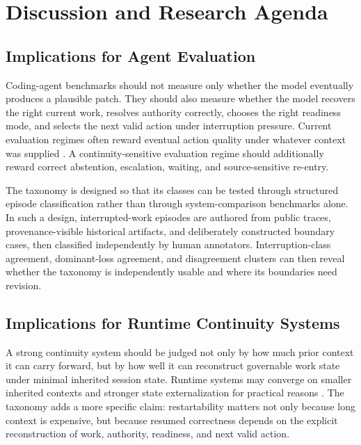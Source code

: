 \documentclass[a4paper,fleqn]{cas-dc}
\begin{document}
\section{Discussion and Research Agenda}

\subsection{Implications for Agent Evaluation}

Coding-agent benchmarks should not measure only whether the model eventually produces a plausible patch. They should also measure whether the model recovers the right current work, resolves authority correctly, chooses the right readiness mode, and selects the next valid action under interruption pressure. Current evaluation regimes often reward eventual action quality under whatever context was supplied \cite{Zhuang2023,LiuAgentBench2023,Jimenez2023,Xiao2024,Maharana2024,LiuLongMem2024,ZhangJ2025}. A continuity-sensitive evaluation regime should additionally reward correct abstention, escalation, waiting, and source-sensitive re-entry.

The taxonomy is designed so that its classes can be tested through structured episode classification rather than through system-comparison benchmarks alone. In such a design, interrupted-work episodes are authored from public traces, provenance-visible historical artifacts, and deliberately constructed boundary cases, then classified independently by human annotators. Interruption-class agreement, dominant-loss agreement, and disagreement clusters can then reveal whether the taxonomy is independently usable and where its boundaries need revision.

\subsection{Implications for Runtime Continuity Systems}

A strong continuity system should be judged not only by how much prior context it can carry forward, but by how well it can reconstruct governable work state under minimal inherited session state. Runtime systems may converge on smaller inherited contexts and stronger state externalization for practical reasons \cite{Yu2026,Yuksel2025,Wang2026,Wu2026}. The taxonomy adds a more specific claim: restartability matters not only because long context is expensive, but because resumed correctness depends on the explicit reconstruction of work, authority, readiness, and next valid action.
\end{document}
